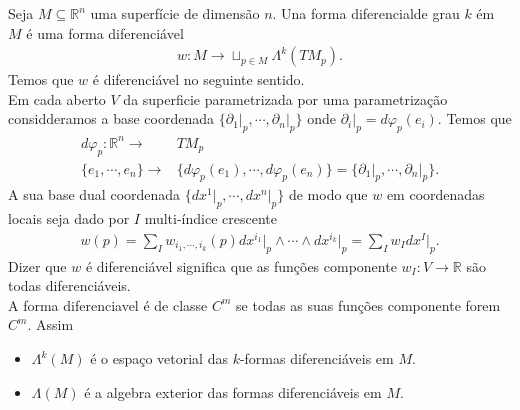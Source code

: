 \begin{definition}
  Seja $M\subseteq\mathbb{R}^{n}$ uma superfície de dimensão $n$.  Una forma diferencialde grau $k$ ém $M$ é uma forma diferenciável
  \begin{align*}
    w:M\to\sqcup_{p\in M}\Lambda^{k}(TM_p).
  \end{align*}
  Temos que $w$ é diferenciável no seguinte sentido.\\
  Em cada aberto $V$ da superficie parametrizada por uma parametrização considderamos a base coordenada $\{\partial_1\big|_p,\cdots,\partial_{n}\big|_p\}$ onde $\partial_i\big|_p=d\varphi_{p}(e_i)$. Temos que
  \begin{align*}
    d\varphi_p:\mathbb{R}^{n}\to& TM_p\\
    \{e_1,\cdots,e_n\}\to&\{d\varphi_p(e_1),\cdots,d\varphi_p(e_n)\}=\{\partial_1\big|_p,\cdots,\partial_n\big|_p\}.
  \end{align*}
  A sua base dual coordenada $\{dx^{1}\big|_p,\cdots,dx^{n}\big|_p\}$ de modo que $w$ em coordenadas locais seja dado por $I$ multi-índice crescente
  \begin{align*}
    w(p)=\sum_{I}w_{i_1,\cdots,i_k}(p)dx^{i_1}\big|_p\wedge\cdots\wedge dx^{i_k}\big|_p=\sum_I w_{I}dx^{I}\big|_p.
  \end{align*}
  Dizer que $w$ é diferenciável significa que as funções componente $w_I:V\to\mathbb{R}$ são todas diferenciáveis.\\
  A forma diferenciavel é de classe $C^m$ se todas as suas funções componente forem $C^{m}$. Assim
  \begin{itemize}
    \item $\Lambda^{k}(M)$ é o espaço vetorial das $k$-formas diferenciáveis em $M$.
    \item $\Lambda(M)$ é a algebra exterior das formas diferenciáveis em $M$. 
  \end{itemize}
\end{definition}
